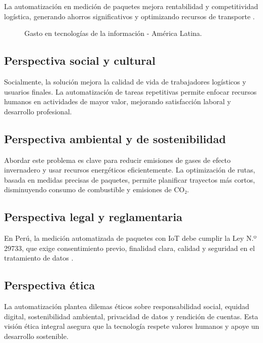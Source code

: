 La automatización en medición de paquetes mejora rentabilidad y competitividad logística, generando ahorros significativos y optimizando recursos de transporte \cite{Krysiska2024}.

\begin{figure}[H]
    \centering
    \caption{Gasto en tecnologías de la información - América Latina.}
    \label{fig:gastos_tecnologia}
\end{figure}

\subsection{Perspectiva social y cultural}

Socialmente, la solución mejora la calidad de vida de trabajadores logísticos y usuarios finales. La automatización de tareas repetitivas permite enfocar recursos humanos en actividades de mayor valor, mejorando satisfacción laboral y desarrollo profesional.

\subsection{Perspectiva ambiental y de sostenibilidad}

Abordar este problema es clave para reducir emisiones de gases de efecto invernadero y usar recursos energéticos eficientemente. La optimización de rutas, basada en medidas precisas de paquetes, permite planificar trayectos más cortos, disminuyendo consumo de combustible y emisiones de CO₂.

\subsection{Perspectiva legal y reglamentaria}

En Perú, la medición automatizada de paquetes con IoT debe cumplir la Ley N.º 29733, que exige consentimiento previo, finalidad clara, calidad y seguridad en el tratamiento de datos \cite{EditoraPer2973}.

\subsection{Perspectiva ética}

La automatización plantea dilemas éticos sobre responsabilidad social, equidad digital, sostenibilidad ambiental, privacidad de datos y rendición de cuentas. Esta visión ética integral asegura que la tecnología respete valores humanos y apoye un desarrollo sostenible.

